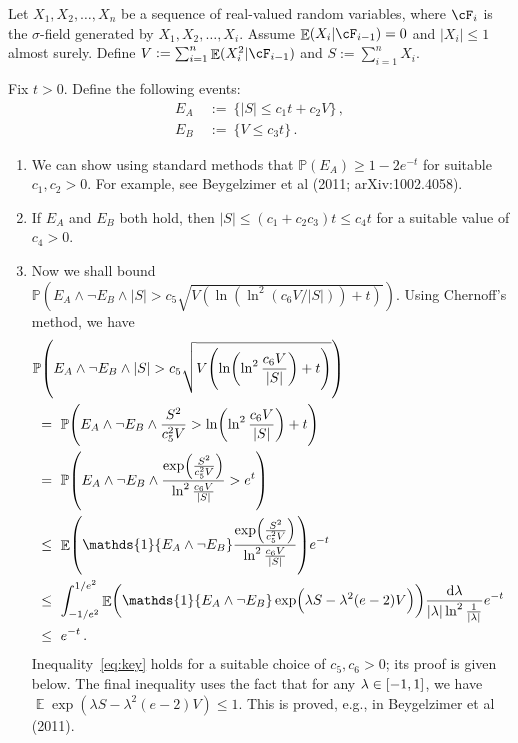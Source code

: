 \documentclass[11pt]{article}
\DeclareMathOperator{\E}{\mathbb{E}}
\renewcommand{\P}{\ensuremath{\mathbb{P}}}
\theoremstyle{remark}
\theoremstyle{definition}
\newcommand\braces[1]{\{#1\}}
\renewcommand\abs[1]{|#1|} %
\newcommand\ind[1]{\ensuremath{\mathds{1}\{#1\}}}
\newcommand\Parens[1]{\mleft(#1\mright)}
\begin{document}
Let $X_1, X_2, \dotsc, X_n$ be a sequence of real-valued random
variables, where $\cF_i$ is the $\sigma$-field generated by $X_1, X_2,
\dotsc, X_i$.
Assume $\E(X_i|\cF_{i-1}) = 0$ and $\abs{X_i} \leq 1$ almost surely.
Define $V := \sum_{i=1}^n \E(X_i^2|\cF_{i-1})$ and $S := \sum_{i=1}^n
X_i$.

Fix $t>0$.
Define the following events:
\begin{align*}
  E_A & \ := \ \braces{ |S| \leq c_1 t + c_2 V }
  \,, \\
  E_B & \ := \ \braces{ V \leq c_3 t }
  \,.
\end{align*}
\begin{enumerate}
  \item
    We can show using standard methods that $\P(E_A) \geq 1-2e^{-t}$
    for suitable $c_1, c_2 > 0$.
    For example, see Beygelzimer et al (2011; arXiv:1002.4058).

  \item
    If $E_A$ and $E_B$ both hold, then $|S| \leq (c_1 + c_2c_3) t \leq
    c_4 t$ for a suitable value of $c_4 > 0$.

  \item
    Now we shall bound $\P(E_A \wedge \neg E_B \wedge |S| > c_5
    \sqrt{V (\ln(\ln^2(c_6V/|S|)) + t)})$.
    Using Chernoff's method, we have
    \begin{align}
      \lefteqn{
        \P\Parens{
          E_A \wedge \neg E_B \wedge
          |S| > c_5 \sqrt{
            V \Parens{
              \ln\Parens{
                \ln^2\frac{c_6V}{|S|}
              } + t
            }
          }
        }
      }
      \notag \\
      & \ = \
      \P\Parens{
        E_A \wedge \neg E_B \wedge
        \frac{S^2}{c_5^2V}
        > \ln\Parens{\ln^2\frac{c_6V}{|S|}} + t
      }
      \notag \\
      & \ = \
      \P\Parens{
        E_A \wedge \neg E_B \wedge
        \frac{
          \exp\Parens{\frac{S^2}{c_5^2V}}
        }{
          \ln^2\frac{c_6V}{|S|}
        }
        > e^t
      }
      \notag \\
      & \ \leq \
      \E\Parens{
        \ind{E_A \wedge \neg E_B}
        \frac{
          \exp\Parens{\frac{S^2}{c_5^2V}}
        }{
          \ln^2\frac{c_6V}{|S|}
        }
      }
      e^{-t}
      \notag \\
      & \ \leq \
      \int_{-1/e^2}^{1/e^2}
      \E\Parens{
        \ind{E_A \wedge \neg E_B}
        \exp\Parens{ \lambda S - \lambda^2 (e-2) V }
      }
      \frac{\dif\lambda}{\abs{\lambda}\ln^2\frac1{\abs{\lambda}}}
      e^{-t}
      \label{eq:key} \\
      & \ \leq \
      e^{-t}
      \,.
    \end{align}
    Inequality~\eqref{eq:key} holds for a suitable choice of
    $c_5, c_6 > 0$; its proof is given below.
    The final inequality uses the fact that for any $\lambda \in
    \intcc{-1,1}$, we have $\E\exp(\lambda S - \lambda^2 (e-2) V) \leq
    1$.
    This is proved, e.g., in Beygelzimer et al (2011).


\end{enumerate}
\end{document}
